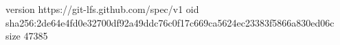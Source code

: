 version https://git-lfs.github.com/spec/v1
oid sha256:2de64e4fd0e32700df92a49ddc76c0f17c669ca5624ec23383f5866a830ed06c
size 47385
